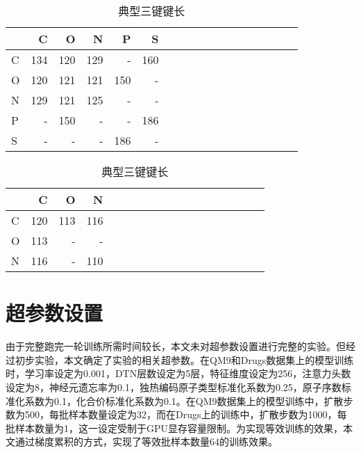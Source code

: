 {\begin{table}[H]
    \centering
    \begin{minipage}[t]{.5\textwidth}
    \begin{table}[H]
    \footnotesize
        \centering
        \caption{典型双键键长}
        \label{tab:double_bond_typ_dist}
        \begin{tabular}{l | r r r r r r r r r r r r r r r r r}
        \toprule
        & C & O & N & P & S \\ \midrule
        C & 134 & 120 & 129 & - & 160 \\
        O & 120 & 121 & 121 & 150 & - \\
        N & 129 & 121 & 125 & - & - \\
        P & - & 150 & - & - & 186 \\
        S & - & - & - & 186 & - \\
        \bottomrule
        \end{tabular}
    \end{table}
    \end{minipage}
    \begin{minipage}[t]{.4\textwidth}
    \begin{table}[H]
    \footnotesize
        \centering
        \caption{典型三键键长}
        \label{tab:tri_bond_typ_dist}
        \begin{tabular}{l | r r r r r r r r r r r r r r r r r}
        \toprule
        & C & O & N \\ \midrule
        C & 120 & 113 & 116 \\
        O & 113 & - & - \\
        N & 116 & - & 110 \\
        \bottomrule
        \end{tabular}
    \end{table}
    \end{minipage}
\end{table}

    
\section{超参数设置}
由于完整跑完一轮训练所需时间较长，本文未对超参数设置进行完整的实验。但经过初步实验，本文确定了实验的相关超参数。在QM9和Drugs数据集上的模型训练时，学习率设定为0.001，DTN层数设定为5层，特征维度设定为256，注意力头数设定为8，神经元遗忘率为0.1，独热编码原子类型标准化系数为0.25，原子序数标准化系数为0.1，化合价标准化系数为0.1。在QM9数据集上的模型训练中，扩散步数为500，每批样本数量设定为32，而在Drugs上的训练中，扩散步数为1000，每批样本数量为1，这一设定受制于GPU显存容量限制。为实现等效训练的效果，本文通过梯度累积的方式，实现了等效批样本数量64的训练效果。


}